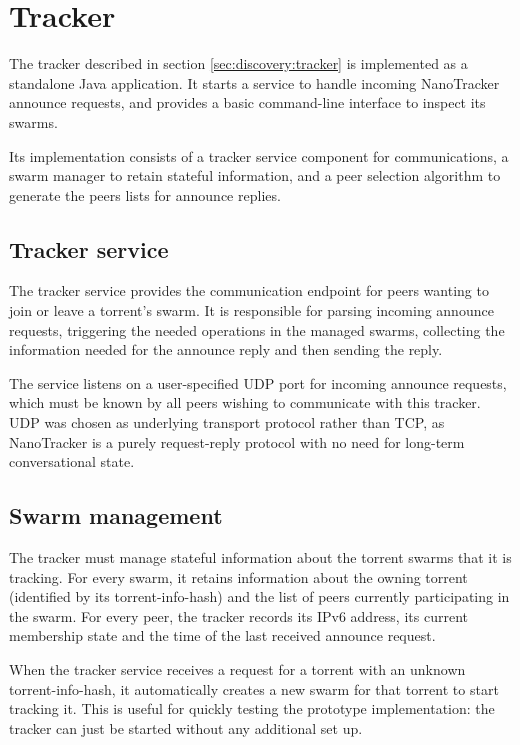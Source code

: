 \section{Tracker}
\label{sec:impl:tracker}
The tracker described in section \ref{sec:discovery:tracker} is implemented as a standalone Java application. It starts a service to handle incoming NanoTracker announce requests, and provides a basic command-line interface to inspect its \glspl{swarm}.

Its implementation consists of a tracker service component for communications, a swarm manager to retain stateful information, and a peer selection algorithm to generate the peers lists for announce replies.

\subsection{Tracker service}
The tracker service provides the communication endpoint for peers wanting to join or leave a torrent's swarm. It is responsible for parsing incoming announce requests, triggering the needed operations in the managed swarms, collecting the information needed for the announce reply and then sending the reply.

The service listens on a user-specified \gls{UDP} port for incoming announce requests, which must be known by all peers wishing to communicate with this tracker. \gls{UDP} was chosen as underlying transport protocol rather than \gls{TCP}, as NanoTracker is a purely request-reply protocol with no need for long-term conversational state.

\subsection{Swarm management}
The tracker must manage stateful information about the torrent swarms that it is tracking. For every swarm, it retains information about the owning torrent (identified by its \gls{torrent-info-hash}) and the list of peers currently participating in the swarm. For every peer, the tracker records its \gls{IPv6} address, its current membership state and the time of the last received announce request.

When the tracker service receives a request for a torrent with an unknown \gls{torrent-info-hash}, it automatically creates a new swarm for that torrent to start tracking it. This is useful for quickly testing the prototype implementation: the tracker can just be started without any additional set up.

